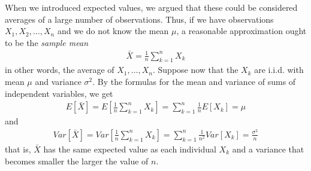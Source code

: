 When we introduced expected values, we argued that these could be considered averages of a large number of observations. Thus, if we have observations $X_1, X_2, \ldots, X_n$ and we do not know the mean $\mu$, a reasonable approximation ought to be the \textit{sample mean}
\begin{align*}
  \bar{X} = \frac{1}{n} \sum_{k = 1}^{n} X_k
\end{align*}
in other words, the average of $X_1, \ldots, X_n$. Suppose now that the $X_k$ are i.i.d. with mean $\mu$ and variance $\sigma^2$. By the formulas for the mean and variance of sums of independent variables, we get
\begin{align*}
  E[\bar{X}] = E\left[ \frac{1}{n} \sum_{k = 1}^{n} X_k \right] = \sum_{k = 1}^{n} \frac{1}{n} E[X_k] = \mu
\end{align*}
and
\begin{align*}
  Var[\bar{X}] = Var \left[\frac{1}{n} \sum_{k = 1}^{n} X_k\right] = \sum_{k = 1}^{n} \frac{1}{n^2} Var[X_k] = \frac{\sigma^2}{n}
\end{align*}
that is, $\bar{X}$ has the same expected value as each individual $X_k$ and a variance that becomes smaller the larger the value of $n$.

